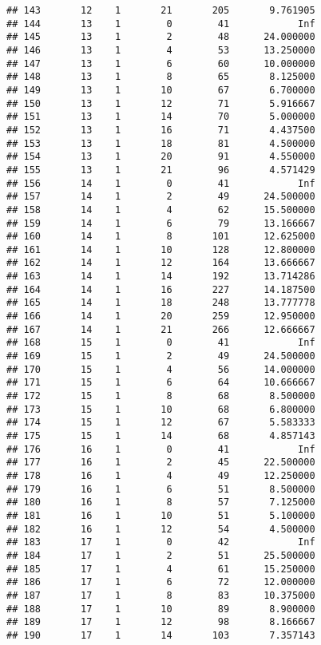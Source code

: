\documentclass[
]{article}
\begin{document}
\begin{verbatim}
## 143       12    1       21       205       9.761905
## 144       13    1        0        41            Inf
## 145       13    1        2        48      24.000000
## 146       13    1        4        53      13.250000
## 147       13    1        6        60      10.000000
## 148       13    1        8        65       8.125000
## 149       13    1       10        67       6.700000
## 150       13    1       12        71       5.916667
## 151       13    1       14        70       5.000000
## 152       13    1       16        71       4.437500
## 153       13    1       18        81       4.500000
## 154       13    1       20        91       4.550000
## 155       13    1       21        96       4.571429
## 156       14    1        0        41            Inf
## 157       14    1        2        49      24.500000
## 158       14    1        4        62      15.500000
## 159       14    1        6        79      13.166667
## 160       14    1        8       101      12.625000
## 161       14    1       10       128      12.800000
## 162       14    1       12       164      13.666667
## 163       14    1       14       192      13.714286
## 164       14    1       16       227      14.187500
## 165       14    1       18       248      13.777778
## 166       14    1       20       259      12.950000
## 167       14    1       21       266      12.666667
## 168       15    1        0        41            Inf
## 169       15    1        2        49      24.500000
## 170       15    1        4        56      14.000000
## 171       15    1        6        64      10.666667
## 172       15    1        8        68       8.500000
## 173       15    1       10        68       6.800000
## 174       15    1       12        67       5.583333
## 175       15    1       14        68       4.857143
## 176       16    1        0        41            Inf
## 177       16    1        2        45      22.500000
## 178       16    1        4        49      12.250000
## 179       16    1        6        51       8.500000
## 180       16    1        8        57       7.125000
## 181       16    1       10        51       5.100000
## 182       16    1       12        54       4.500000
## 183       17    1        0        42            Inf
## 184       17    1        2        51      25.500000
## 185       17    1        4        61      15.250000
## 186       17    1        6        72      12.000000
## 187       17    1        8        83      10.375000
## 188       17    1       10        89       8.900000
## 189       17    1       12        98       8.166667
## 190       17    1       14       103       7.357143

\end{verbatim}
\end{document}
